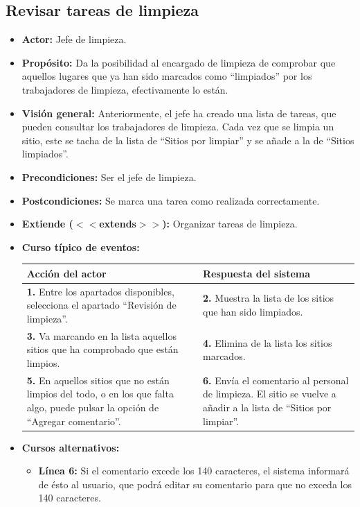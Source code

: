 \documentclass[spanish,a4paper,11pt, twoside]{report}	%
\begin{document}

	\subsection{Revisar tareas de limpieza}
			\begin{itemize}
				\item \textbf{Actor: }Jefe de limpieza.
				\item \textbf{Propósito: }Da la posibilidad al encargado de limpieza de
					comprobar que aquellos lugares que ya han sido marcados como ``limpiados''  por
					los trabajadores de limpieza, efectivamente lo están.
				\item \textbf{Visión general: }Anteriormente, el jefe ha creado una lista de
					tareas, que pueden consultar los trabajadores de limpieza. Cada vez que se
					limpia un sitio, este se tacha de la lista de ``Sitios por limpiar'' y se añade a
					la de ``Sitios limpiados''.
				\item \textbf{Precondiciones:} Ser el jefe de limpieza.
				\item \textbf{Postcondiciones:} Se marca una tarea como realizada correctamente.
				\item \textbf{Extiende ($<<$extends$>>$):} Organizar tareas de limpieza.
				\item \textbf{Curso típico de eventos:}\\
				\begin{tabular}{|p{6cm}||p{6cm}|}
					\hline
					\textbf{Acción del actor} & \textbf{Respuesta del sistema} \\ \hline \hline
					\textbf{1.} Entre los apartados disponibles, selecciona el apartado ``Revisión de limpieza''. &
					\textbf{2.} Muestra la lista de los sitios que han sido limpiados. \\ \hline
					\textbf{3.} Va marcando en la lista aquellos sitios que ha comprobado que están limpios.	& 
					\textbf{4.} Elimina de la lista los sitios marcados. \\ \hline
					\textbf{5.} En aquellos sitios que no están limpios del todo, o en los que falta
						algo, puede pulsar la opción de ``Agregar comentario''. & 
					\textbf{6.} Envía el comentario al personal de limpieza. El sitio se vuelve a añadir a la lista de
						``Sitios por limpiar''.\\ \hline
				\end{tabular}
			\item \textbf{Cursos alternativos:} 
				\begin{itemize}
					\item \textbf{Línea 6: }Si el comentario excede los 140 caracteres, el sistema
						informará de ésto al usuario, que podrá editar su comentario para que no exceda
						los 140 caracteres.
				\end{itemize}
		\end {itemize}
\end{document}
